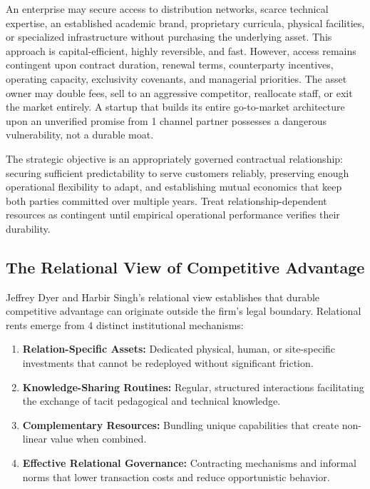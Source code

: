 An enterprise may secure access to distribution networks, scarce technical expertise, an established academic brand, proprietary curricula, physical facilities, or specialized infrastructure without purchasing the underlying asset. This approach is capital-efficient, highly reversible, and fast. However, access remains contingent upon contract duration, renewal terms, counterparty incentives, operating capacity, exclusivity covenants, and managerial priorities. The asset owner may double fees, sell to an aggressive competitor, reallocate staff, or exit the market entirely. A startup that builds its entire go-to-market architecture upon an unverified promise from 1 channel partner possesses a dangerous vulnerability, not a durable moat.

The strategic objective is an appropriately governed contractual relationship: securing sufficient predictability to serve customers reliably, preserving enough operational flexibility to adapt, and establishing mutual economics that keep both parties committed over multiple years. Treat relationship-dependent resources as contingent until empirical operational performance verifies their durability.

\subsection{The Relational View of Competitive Advantage}
\label{sec:relational_view_competitive_advantage}

Jeffrey Dyer and Harbir Singh's relational view establishes that durable competitive advantage can originate outside the firm's legal boundary. Relational rents emerge from 4 distinct institutional mechanisms:
\begin{enumerate}
\item \textbf{Relation-Specific Assets:} Dedicated physical, human, or site-specific investments that cannot be redeployed without significant friction.
\item \textbf{Knowledge-Sharing Routines:} Regular, structured interactions facilitating the exchange of tacit pedagogical and technical knowledge.
\item \textbf{Complementary Resources:} Bundling unique capabilities that create non-linear value when combined.
\item \textbf{Effective Relational Governance:} Contracting mechanisms and informal norms that lower transaction costs and reduce opportunistic behavior.
\end{enumerate}

